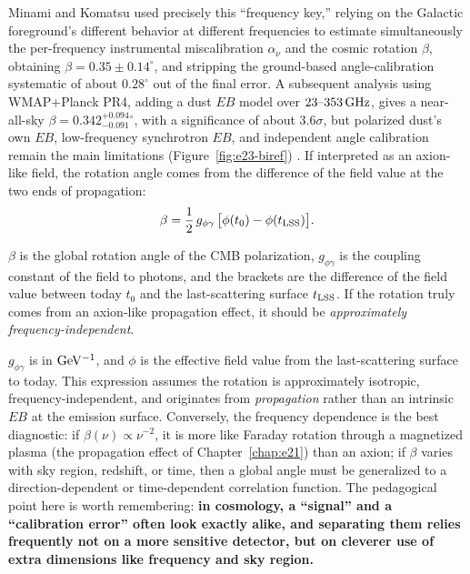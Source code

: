 Minami and Komatsu used precisely this ``frequency key,'' relying on the Galactic foreground's different behavior at different frequencies to estimate simultaneously the per-frequency instrumental miscalibration \(\alpha_\nu\) and the cosmic rotation \(\beta\), obtaining \(\beta=0.35\pm0.14^\circ\), and stripping the ground-based angle-calibration systematic of about \(0.28^\circ\) out of the final error. A subsequent analysis using WMAP+Planck PR4, adding a dust \(EB\) model over \(23\text{--}353\,{\rm GHz}\), gives a near-all-sky \(\beta=0.342^{+0.094}_{-0.091}{}^\circ\), with a significance of about \(3.6\sigma\), but polarized dust's own \(EB\), low-frequency synchrotron \(EB\), and independent angle calibration remain the main limitations (Figure~\ref{fig:e23-biref}) \citep{2020PhRvL.125v1301M,2022PhRvD.106f3503E,2022PhRvL.128i1302D,2022NatRP...4..452K}. If interpreted as an axion-like field, the rotation angle comes from the difference of the field value at the two ends of propagation:
\begin{equation}
  \beta=\frac12\,g_{\phi\gamma}\,\bigl[\phi(t_0)-\phi(t_{\rm LSS})\bigr] .
  \label{eq:e23-axion-birefringence}
\end{equation}
\begin{formulaexplain}
\(\beta\) is the global rotation angle of the CMB polarization, \(g_{\phi\gamma}\) is the coupling constant of the field to photons, and the brackets are the difference of the field value between today \(t_0\) and the last-scattering surface \(t_{\rm LSS}\). If the rotation truly comes from an axion-like propagation effect, it should be \emph{approximately frequency-independent}.
\end{formulaexplain}
\(g_{\phi\gamma}\) is in \({\rm GeV^{-1}}\), and \(\phi\) is the effective field value from the last-scattering surface to today. This expression assumes the rotation is approximately isotropic, frequency-independent, and originates from \emph{propagation} rather than an intrinsic \(EB\) at the emission surface. Conversely, the frequency dependence is the best diagnostic: if \(\beta(\nu)\propto\nu^{-2}\), it is more like Faraday rotation through a magnetized plasma (the propagation effect of Chapter~\ref{chap:e21}) than an axion; if \(\beta\) varies with sky region, redshift, or time, then a global angle must be generalized to a direction-dependent or time-dependent correlation function. The pedagogical point here is worth remembering: \textbf{in cosmology, a ``signal'' and a ``calibration error'' often look exactly alike, and separating them relies frequently not on a more sensitive detector, but on cleverer use of extra dimensions like frequency and sky region.}

